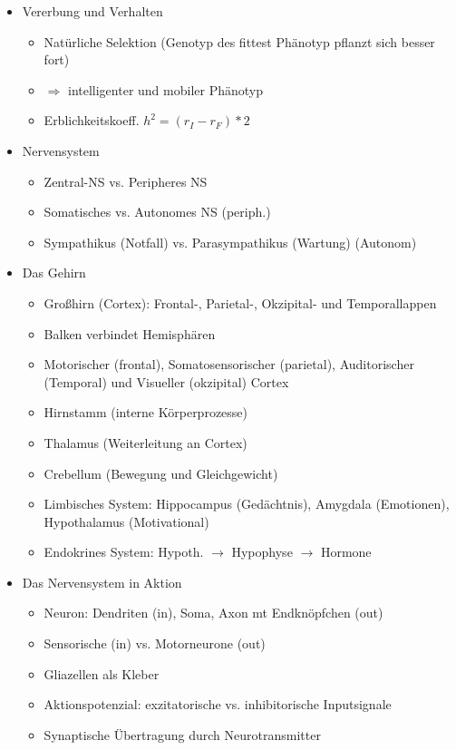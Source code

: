 \documentclass[11pt, paper=a4, twocolumn]{scrartcl}
\begin{document}
	\begin{itemize}
		\item Vererbung und Verhalten
			\begin{itemize}
				\item Natürliche Selektion (Genotyp des fittest Phänotyp 
					pflanzt sich besser fort)
				\item $\Rightarrow$ intelligenter und mobiler Phänotyp
				\item Erblichkeitskoeff. $h^2=(r_I-r_F)*2$
			\end{itemize}

		\item Nervensystem
			\begin{itemize}
				\item Zentral-NS vs. Peripheres NS
				\item Somatisches vs. Autonomes NS (periph.)
				\item Sympathikus (\glqq{}Notfall\grqq{}) vs. 
					Parasympathikus (\glqq{}Wartung\grqq{}) (Autonom)
			\end{itemize}

		\item Das Gehirn
			\begin{itemize}
				\item Großhirn (Cortex): Frontal-, Parietal-, Okzipital- 
					und Temporallappen
				\item Balken verbindet Hemisphären
				\item Motorischer (frontal), Somatosensorischer 
					(parietal), Auditorischer (Temporal) und Visueller 
					(okzipital) Cortex
				\item Hirnstamm (interne Körperprozesse)
				\item Thalamus (Weiterleitung an Cortex)
				\item Crebellum (Bewegung und Gleichgewicht)
				\item Limbisches System: Hippocampus (Gedächtnis), 
					Amygdala (Emotionen), Hypothalamus (Motivational)
				\item Endokrines System: Hypoth. $\rightarrow$ Hypophyse 
					$\rightarrow$ Hormone
			\end{itemize}

		\item Das Nervensystem in Aktion
			\begin{itemize}
				\item Neuron: Dendriten (in), Soma, Axon mt Endknöpfchen 
					(out) 
				\item Sensorische (in) vs. Motorneurone (out)
				\item Gliazellen als \glqq{}Kleber\grqq{}
				\item Aktionspotenzial: exzitatorische vs. inhibitorische 
					Inputsignale
				\item Synaptische Übertragung durch Neurotransmitter
			\end{itemize}


\end{itemize}
\end{document}
